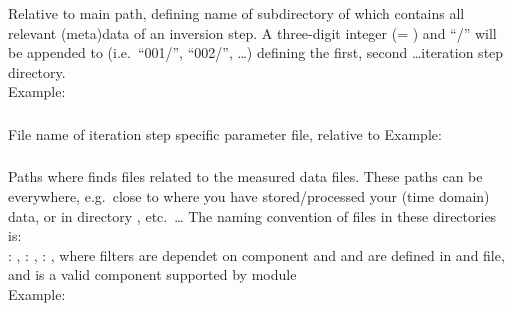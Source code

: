 \subsubsection{} \label{files,sec:main_parfile,itm:iter_path}
Relative to main path, defining name of subdirectory of  which contains 
all relevant (meta)data of an inversion step. A three-digit integer (= ) 
and ``/'' will be appended to  (i.e.\ ``001/'', ``002/'', \dots) defining the 
first, second \dots iteration step directory.\\
Example: 
\subsubsection{} \label{files,sec:main_parfile,itm:iter_parfile}
File name of iteration step specific parameter file, relative to 
Example: 
\subsubsection{} 
\label{files,sec:main_parfile,itm:path_mdata_filters}
Paths where \ASKI finds files related to the measured data files. These paths can be everywhere, e.g.\ close to where you 
have stored/processed your (time domain) data, or in directory , etc.\ \dots
The naming convention of files in these directories is:\\
: ,
: ,
: , 
where filters are dependet on component and  and  are 
defined in  and  file, and  
is a valid component supported by module \\
Example: \\
\\
\\
